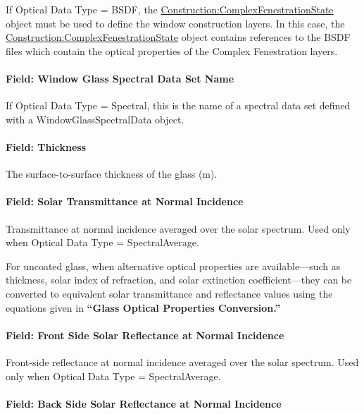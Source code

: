 If Optical Data Type = BSDF, the \hyperref[constructioncomplexfenestrationstate]{Construction:ComplexFenestrationState} object must be used to define the window construction layers. In this case, the \hyperref[constructioncomplexfenestrationstate]{Construction:ComplexFenestrationState} object contains references to the BSDF files which contain the optical properties of the Complex Fenestration layers.

\paragraph{Field: Window Glass Spectral Data Set Name}\label{field-window-glass-spectral-data-set-name}

If Optical Data Type = Spectral, this is the name of a spectral data set defined with a WindowGlassSpectralData object.

\paragraph{Field: Thickness}\label{field-thickness-1}

The surface-to-surface thickness of the glass (m).

\paragraph{Field: Solar Transmittance at Normal Incidence}\label{field-solar-transmittance-at-normal-incidence}

Transmittance at normal incidence averaged over the solar spectrum. Used only when Optical Data Type = SpectralAverage.

For uncoated glass, when alternative optical properties are available---such as thickness, solar index of refraction, and solar extinction coefficient---they can be converted to equivalent solar transmittance and reflectance values using the equations given in \textbf{``Glass Optical Properties Conversion.''}

\paragraph{Field: Front Side Solar Reflectance at Normal Incidence}\label{field-front-side-solar-reflectance-at-normal-incidence}

Front-side reflectance at normal incidence averaged over the solar spectrum. Used only when Optical Data Type = SpectralAverage.

\paragraph{Field: Back Side Solar Reflectance at Normal Incidence}\label{field-back-side-solar-reflectance-at-normal-incidence}

